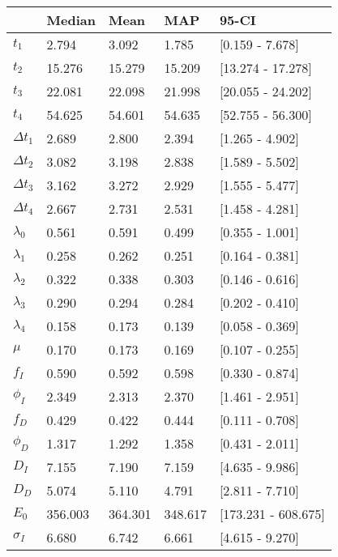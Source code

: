 \begin{tabular}{lllll}
\toprule
{} &   Median &     Mean &      MAP &                95-CI \\
\midrule
$t_1$        &    2.794 &    3.092 &    1.785 &      [0.159 - 7.678] \\
$t_2$        &   15.276 &   15.279 &   15.209 &    [13.274 - 17.278] \\
$t_3$        &   22.081 &   22.098 &   21.998 &    [20.055 - 24.202] \\
$t_4$        &   54.625 &   54.601 &   54.635 &    [52.755 - 56.300] \\
$\Delta t_1$ &    2.689 &    2.800 &    2.394 &      [1.265 - 4.902] \\
$\Delta t_2$ &    3.082 &    3.198 &    2.838 &      [1.589 - 5.502] \\
$\Delta t_3$ &    3.162 &    3.272 &    2.929 &      [1.555 - 5.477] \\
$\Delta t_4$ &    2.667 &    2.731 &    2.531 &      [1.458 - 4.281] \\
$\lambda_0$  &    0.561 &    0.591 &    0.499 &      [0.355 - 1.001] \\
$\lambda_1$  &    0.258 &    0.262 &    0.251 &      [0.164 - 0.381] \\
$\lambda_2$  &    0.322 &    0.338 &    0.303 &      [0.146 - 0.616] \\
$\lambda_3$  &    0.290 &    0.294 &    0.284 &      [0.202 - 0.410] \\
$\lambda_4$  &    0.158 &    0.173 &    0.139 &      [0.058 - 0.369] \\
$\mu$        &    0.170 &    0.173 &    0.169 &      [0.107 - 0.255] \\
$f_I$        &    0.590 &    0.592 &    0.598 &      [0.330 - 0.874] \\
$\phi_I$     &    2.349 &    2.313 &    2.370 &      [1.461 - 2.951] \\
$f_D$        &    0.429 &    0.422 &    0.444 &      [0.111 - 0.708] \\
$\phi_D$     &    1.317 &    1.292 &    1.358 &      [0.431 - 2.011] \\
$D_I$        &    7.155 &    7.190 &    7.159 &      [4.635 - 9.986] \\
$D_D$        &    5.074 &    5.110 &    4.791 &      [2.811 - 7.710] \\
$E_0$        &  356.003 &  364.301 &  348.617 &  [173.231 - 608.675] \\
$\sigma_I$   &    6.680 &    6.742 &    6.661 &      [4.615 - 9.270] \\

\end{tabular}
